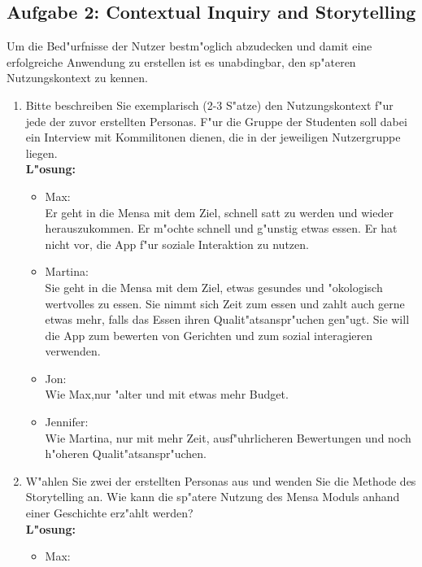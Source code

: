 \subsection{Aufgabe 2:  Contextual Inquiry and Storytelling }
Um  die  Bed"urfnisse  der  Nutzer  bestm"oglich  abzudecken  und  damit  eine  erfolgreiche Anwendung zu erstellen ist es unabdingbar, den sp"ateren Nutzungskontext zu kennen.\\
\begin {enumerate}
    \item Bitte beschreiben Sie exemplarisch (2-3 S"atze) den Nutzungskontext f"ur jede der zuvor erstellten  Personas.  
        F"ur  die  Gruppe  der  Studenten  soll  dabei  ein  Interview  mit Kommilitonen dienen, die in der jeweiligen Nutzergruppe liegen.  \\
    \textbf{L"osung:}
    \begin{itemize}
        \item Max: \\
            Er geht in die Mensa mit dem Ziel, schnell satt zu werden und wieder herauszukommen.
            Er m"ochte schnell und g"unstig etwas essen.
            Er hat nicht vor, die App f"ur soziale Interaktion zu nutzen.
        \item Martina: \\
            Sie geht in die Mensa mit dem Ziel, etwas gesundes und "okologisch wertvolles zu essen.
            Sie nimmt sich Zeit zum essen und zahlt auch gerne etwas mehr, falls das Essen ihren Qualit"atsanspr"uchen gen"ugt.
            Sie will die App zum bewerten von Gerichten und zum sozial interagieren verwenden.
        \item Jon: \\
            Wie Max,nur "alter und mit etwas mehr Budget.
        \item Jennifer: \\
            Wie Martina, nur mit mehr Zeit, ausf"uhrlicheren Bewertungen und noch h"oheren Qualit"atsanspr"uchen.
    \end{itemize}
    \item W"ahlen  Sie  zwei  der  erstellten  Personas  aus  und  wenden  Sie  die  Methode  des Storytelling  an.  
        Wie  kann  die  sp"atere  Nutzung  des  Mensa  Moduls  anhand  einer Geschichte erz"ahlt werden? \\
    \textbf{L"osung:}        
    \begin{itemize}
        \item Max: \\

\end{itemize}
\end{enumerate}
